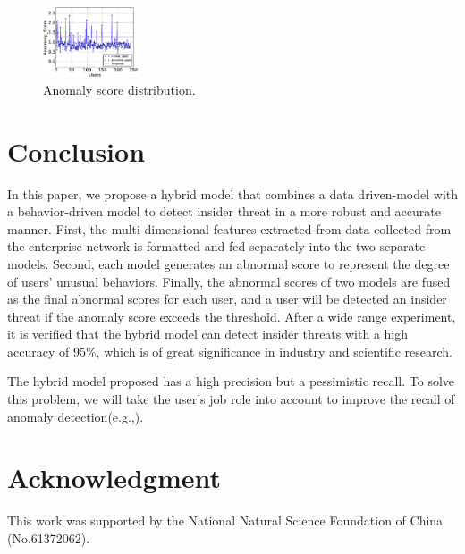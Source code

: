 \documentclass[conference]{IEEEtran}
\begin{document}
\begin{figure}[htb]
\centerline{\includegraphics[width = 0.25\textwidth]{figure/figure8.eps}}
\caption{Anomaly score distribution.}
\label{fig}
\end{figure}

\section{Conclusion}

In this paper, we propose a hybrid model that combines a data driven-model with a behavior-driven model to detect insider threat in a more robust and accurate manner. 
First, the multi-dimensional features extracted from data collected from the enterprise network is formatted and fed separately into the two separate models. Second, each model generates an abnormal score to represent the degree of users' unusual behaviors. Finally, the abnormal scores of two models are fused as the final abnormal scores for each user, and a user will be detected an insider threat if the anomaly score exceeds the threshold. After a wide range experiment, it is 
verified that the hybrid model can detect insider threats with a high accuracy of 95\%, which is of great significance in industry and scientific research.

The hybrid model proposed has a high precision but a pessimistic recall. To solve this problem, we will take the user’s job role into account to improve the recall of anomaly detection(e.g.,\cite{b16}).       



\section*{Acknowledgment}

This work was supported by the National Natural Science Foundation of China (No.61372062).
\end{document}
